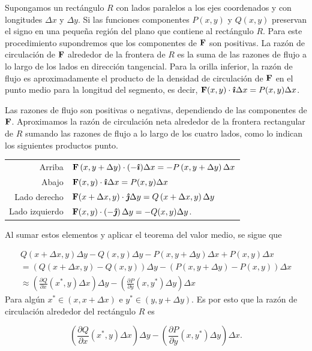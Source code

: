 Supongamos un rectángulo $R$ con lados paralelos a los ejes coordenados y con longitudes $\Delta x$ y $\Delta y$. Si las funciones componentes
$P(x,y) $ y $Q(x,y) $ preservan el signo en una pequeña región del plano que contiene al rectángulo $R$.
Para este procedimiento supondremos que los componentes de ${\bf F} $ son positivas.
La razón de circulación de ${\bf F} $ alrededor de la frontera de $R$ es la suma de las razones de flujo a lo largo de los lados en dirección tangencial. Para la orilla inferior, la razón de flujo es aproximadamente el producto de la densidad de circulación de ${\bf F}$ en el punto medio para la longitud del segmento, es decir,
${\bf F} (x,y)\cdot\boldsymbol{\hat{\imath}}\Delta x=P(x,y)\Delta x$.

Las razones de flujo son positivas o negativas, dependiendo de las componentes de
${\bf F} $. Aproximamos la razón de circulación neta alrededor de la frontera rectangular de $R$ sumando las razones de flujo a lo largo de los cuatro lados, como lo indican los siguientes productos punto.

\begin{tabular}{rl}
Arriba &  ${\bf F} \left( x,y+\Delta y\right) \cdot (-\boldsymbol{\hat{\imath}}) \Delta x=-P\left( x,y+\Delta y\right) \Delta x$ \\
Abajo & ${\bf F} (x,y) \cdot \boldsymbol{\hat{\imath}}\Delta x=P(x,y) \Delta x$ \\
Lado derecho & ${\bf F} ( x+\Delta x,y) \cdot \boldsymbol{\hat{\jmath}}\Delta y=Q\left(x+\Delta x,y\right) \Delta y$ \\
Lado izquierdo & ${\bf F} (x,y) \cdot \left( -\boldsymbol{\hat{\jmath}}\right) \Delta y=-Q(x,y) \Delta y$.
\end{tabular}

Al sumar estos elementos y aplicar el teorema del valor medio, se sigue que

\begin{multline}
Q( x+\Delta x,y) \Delta y-Q(x,y) \Delta y-P\left(x,y+\Delta y\right) \Delta x+P(x,y) \Delta x \\
=(Q( x+\Delta x,y) -Q(x,y)) \Delta y-\left(P\left( x,y+\Delta y\right) -P(x,y) \right) \Delta x\\
\approx \left( \frac{\partial Q}{\partial x}(x^{\ast },y)\Delta x\right) \Delta y-\left( \frac{\partial P}{\partial y}\left(x,y^{\ast }\right) \Delta y\right) \Delta x \
\end{multline}
Para algún $x^* \in (x,x+\Delta x)$ e $y^* \in (y,y+\Delta y)$.
Es por esto que la razón de circulación alrededor del rectángulo $R$ es

\[\left( \frac{\partial Q}{\partial x}(x^{\ast },y) \Delta x\right) \Delta y-\left( \frac{\partial P}{\partial y}\left( x,y^{\ast }\right) \Delta y\right) \Delta x.\]

